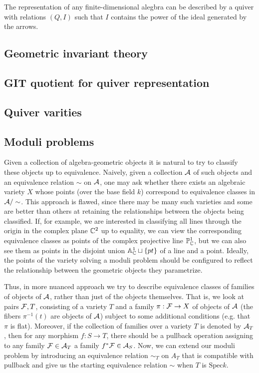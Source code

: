         The representation of any finite-dimensional alegbra can be described by a quiver with relations $(Q,I)$ such that $I$ contains the power of the ideal generated by the arrows.

    \subsection{Geometric invariant theory}

    \subsection{GIT quotient for quiver representation}

    \subsection{Quiver varities}

    \subsection{Moduli problems}

        Given a collection of algebra-geometric objects it is natural to try to classify these objects up to equivalence. Naively, given a collection $\mathcal{A}$ of such objects and an equivalence relation $\sim$ on $\mathcal{A}$, one may ask whether there exists an algebraic variety $X$ whose points (over the base field $k$) correspond to equivalence classes in $\mathcal{A}/\sim$. This approach is flawed, since there may be many such varieties and some are better than others at retaining the relationships between the objects being classified. If, for example, we are interested in classifying all lines through the origin in the complex plane $\mathbb{C}^2$ up to equality, we can view the corresponding equivalence classes as points of the complex projective line $\mathbb{P}^1_{\mathbb{C}}$, but we can also see them as points in the disjoint union $\mathbb{A}^1_{\mathbb{C}}\sqcup\{pt\}$ of a line and a point. Ideally, the points of the variety solving a moduli problem should be configured to reflect the relationship between the geometric objects they parametrize.
        
        Thus, in more nuanced approach we try to describe equivalence classes of families of objects of $\mathcal{A}$, rather than just of the objects themselves. That is, we look at pairs $\mathcal{F},T$, consisting of a variety $T$ and a family $\pi:\mathcal{F}\to X$ of objects of $\mathcal{A}$ (the fibers $\pi^{-1}(t)$ are objects of $\mathcal{A}$) subject to some additional conditions (e.g. that $\pi$ is flat). Moreover, if the collection of families over a variety $T$ is denoted by $\mathcal{A}_T$, then for any morphism $f:S\to T$, there should be a pullback operation assigning to any family $\mathcal{F}\in \mathcal{A}_T$ a family $f^*\mathcal{F}\in\mathcal{A}_S$. Now, we can extend our moduli problem by introducing an equivalence relation $\sim_T$ on $A_T$ that is compatible with pullback and give us the starting equivalence relation $\sim$ when $T$ is $\text{Spec}k$.
        
